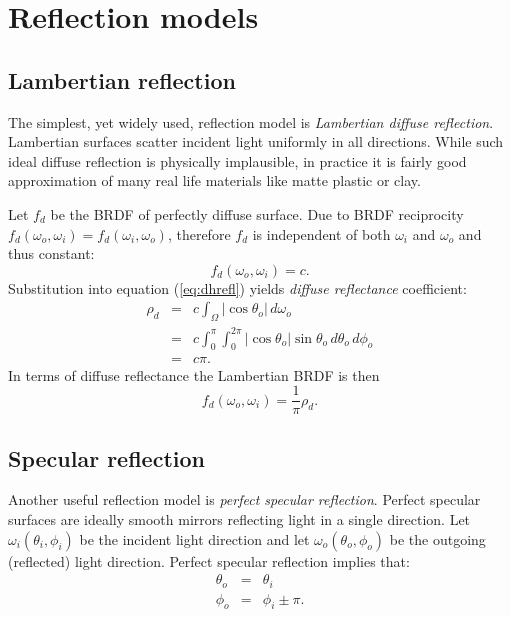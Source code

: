 \section{Reflection models}

\subsection{Lambertian reflection}
The simplest, yet widely used, reflection model is \emph{Lambertian diffuse reflection}. Lambertian surfaces scatter incident light uniformly in all directions. While such ideal diffuse reflection is physically implausible, in practice it is fairly good approximation of many real life materials like matte plastic or clay.

Let $f_{d}$ be the BRDF of perfectly diffuse surface. Due to BRDF reciprocity $f_{d}(\omega_{o}, \omega_{i}) = f_{d}(\omega_{i}, \omega_{o})$, therefore $f_{d}$ is independent of both $\omega_{i}$ and $\omega_{o}$ and thus constant:
\begin{equation}
  f_{d}(\omega_{o}, \omega_{i}) = c.
\end{equation}
Substitution into equation (\ref{eq:dhrefl}) yields \emph{diffuse reflectance} coefficient:
\begin{eqnarray}
  \rho_{d} &=& c \int_{\Omega} |\cos\theta_{o}| \,d\omega_{o} \\
  &=& c \int_{0}^{\pi} \int_{0}^{2\pi} |\cos\theta_{o}| \sin\theta_{o} \,d\theta_{o} \,d\phi_{o} \\
  &=& c \pi.
\end{eqnarray}
In terms of diffuse reflectance the Lambertian BRDF is then
\begin{equation}
  f_{d}(\omega_{o}, \omega_{i}) = \frac{1}{\pi} \rho_{d}.
\end{equation}

\subsection{Specular reflection}
Another useful reflection model is \emph{perfect specular reflection}. Perfect specular surfaces are ideally smooth mirrors reflecting light in a single direction. Let $\omega_{i}(\theta_{i}, \phi_{i})$ be the incident light direction and let $\omega_{o}(\theta_{o}, \phi_{o})$ be the outgoing (reflected) light direction. Perfect specular reflection implies that:
\begin{eqnarray}
\label{eq:reflection}
  \theta_{o} &=& \theta_{i} \nonumber \\
  \phi_{o} &=& \phi_{i} \pm \pi.
\end{eqnarray}

